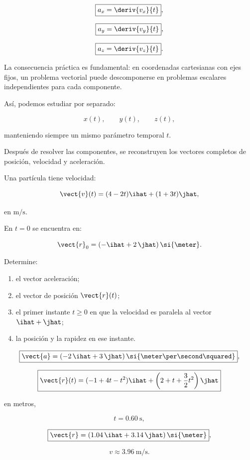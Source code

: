 \begin{explicacion}
\[
\boxed{
a_x=\deriv{v_x}{t}
},
\]

\[
\boxed{
a_y=\deriv{v_y}{t}
},
\]

\[
\boxed{
a_z=\deriv{v_z}{t}
}.
\]

La consecuencia práctica es fundamental: en coordenadas cartesianas con ejes fijos, un problema vectorial puede descomponerse en problemas escalares independientes para cada componente.

Así, podemos estudiar por separado:

\[
x(t),\qquad y(t),\qquad z(t),
\]

manteniendo siempre un mismo parámetro temporal \(t\).

Después de resolver las componentes, se reconstruyen los vectores completos de posición, velocidad y aceleración.
\end{explicacion}


\begin{ejercicio}
Una partícula tiene velocidad:

\[
\vect{v}(t)
=
(4-2t)\ihat
+
(1+3t)\jhat,
\]

en \(\si{\meter\per\second}\).

En \(t=0\) se encuentra en:

\[
\vect{r}_0
=
(-\ihat+2\,\jhat)\,\si{\meter}.
\]

Determine:

\begin{enumerate}[label=\alph*)]
    \item el vector aceleración;
    \item el vector de posición \(\vect{r}(t)\);
    \item el primer instante \(t\geq0\) en que la velocidad es paralela al vector \(\ihat+\jhat\);
    \item la posición y la rapidez en ese instante.
\end{enumerate}
\end{ejercicio}

\begin{respuesta}
\[
\boxed{
\vect{a}
=
(-2\,\ihat+3\,\jhat)\,
\si{\meter\per\second\squared}
},
\]

\[
\boxed{
\vect{r}(t)
=
(-1+4t-t^2)\ihat
+
\left(2+t+\frac{3}{2}t^2\right)\jhat
}
\]

en metros,

\[
\boxed{t=\SI{0.60}{\second}},
\]

\[
\boxed{
\vect{r}
=
(1.04\,\ihat+3.14\,\jhat)\,\si{\meter}
},
\]

\[
\boxed{
v\approx\SI{3.96}{\meter\per\second}
}.
\]
\end{respuesta}

